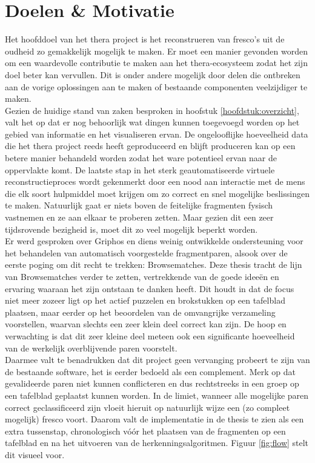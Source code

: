 \chapter{Doelen \& Motivatie}
\label{hoofdstuk:doelen}

Het hoofddoel van het thera project is het reconstrueren van fresco's uit de oudheid zo gemakkelijk mogelijk te maken. Er moet een manier gevonden worden om een waardevolle contributie te maken aan het thera-ecosysteem zodat het zijn doel beter kan vervullen. Dit is onder andere mogelijk door delen die ontbreken aan de vorige oplossingen aan te maken of bestaande componenten veelzijdiger te maken.\\

Gezien de huidige stand van zaken besproken in hoofstuk \ref{hoofdstuk:overzicht}, valt het op dat er nog behoorlijk wat dingen kunnen toegevoegd worden op het gebied van informatie en het visualiseren ervan. De ongelooflijke hoeveelheid data die het thera project reeds heeft geproduceerd en blijft produceren kan op een betere manier behandeld worden zodat het ware potentieel ervan naar de oppervlakte komt. De laatste stap in het sterk geautomatiseerde virtuele reconstructieproces wordt gekenmerkt door een nood aan interactie met de mens die elk soort hulpmiddel moet krijgen om zo correct en snel mogelijke beslissingen te maken. Natuurlijk gaat er niets boven de feitelijke fragmenten fysisch vastnemen en ze aan elkaar te proberen zetten. Maar gezien dit een zeer tijdsrovende bezigheid is, moet dit zo veel mogelijk beperkt worden.\\

Er werd gesproken over Griphos en diens weinig ontwikkelde ondersteuning voor het behandelen van automatisch voorgestelde fragmentparen, alsook over de eerste poging om dit recht te trekken: Browsematches. Deze thesis tracht de lijn van Browsematches verder te zetten, vertrekkende van de goede idee\"en en ervaring waaraan het zijn ontstaan te danken heeft. Dit houdt in dat de focus niet meer zozeer ligt op het actief puzzelen en brokstukken op een tafelblad plaatsen, maar eerder op het beoordelen van de omvangrijke verzameling voorstellen, waarvan slechts een zeer klein deel correct kan zijn. De hoop en verwachting is dat dit zeer kleine deel meteen ook een significante hoeveelheid van de werkelijk overblijvende paren voorstelt.\\

Daarmee valt te benadrukken dat dit project geen vervanging probeert te zijn van de bestaande software, het is eerder bedoeld als een complement. Merk op dat gevalideerde paren niet kunnen conflicteren en dus rechtstreeks in een groep op een tafelblad geplaatst kunnen worden. In de limiet, wanneer alle mogelijke paren correct geclassificeerd zijn vloeit hieruit op natuurlijk wijze een (zo compleet mogelijk) fresco voort. Daarom valt de implementatie in de thesis te zien als een extra tussenstap, chronologisch v\'o\'or het plaatsen van de fragmenten op een tafelblad en na het uitvoeren van de herkenningsalgoritmen. Figuur \ref{fig:flow} stelt dit visueel voor.

